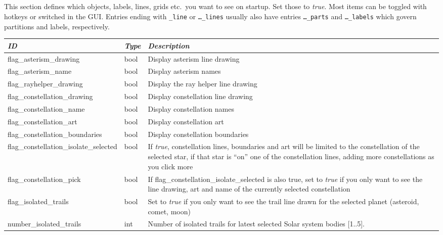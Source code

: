 \subsection{}

This section defines which objects, labels, lines, grids etc.\ you
want to see on startup. Set those to \emph{true}. Most items can be
toggled with hotkeys or switched in the GUI. Entries ending with
\texttt{\_line} or \texttt{\ldots\_lines} usually also have entries
\texttt{\ldots\_parts} and \texttt{\ldots\_labels} which govern
partitions and labels, respectively.

\begin{longtable}{l|l|p{77mm}}
\toprule
\emph{ID} & \emph{Type} & \emph{Description}\\\midrule
flag\_asterism\_drawing         & bool  & Display asterism line drawing\\%
flag\_asterism\_name            & bool  & Display asterism names\\%
flag\_rayhelper\_drawing        & bool  & Display the ray helper line drawing\\%
flag\_constellation\_drawing    & bool  & Display constellation line drawing\\%
flag\_constellation\_name       & bool  & Display constellation names\\%
flag\_constellation\_art        & bool  & Display constellation art\\%
flag\_constellation\_boundaries & bool  & Display constellation boundaries \\%
flag\_constellation\_isolate\_selected  & bool & If \emph{true}, constellation lines, boundaries and art will be limited to the constellation of the selected star, 
                                                 if that star is ``on'' one of the constellation lines, adding more constellations as you click more \\%
flag\_constellation\_pick     & bool & If flag\_constellation\_isolate\_selected is also true, 
                                       set to \emph{true} if you only want to see the line drawing, 
									   art and name of the currently selected constellation\\\midrule
%
flag\_isolated\_trails        & bool & Set to \emph{true} if you only want to see the trail line drawn for the selected planet (asteroid, comet, moon)\\%
number\_isolated\_trails      & int  & Number of isolated trails for latest selected Solar system bodies [1..5].\\%

\end{longtable}
